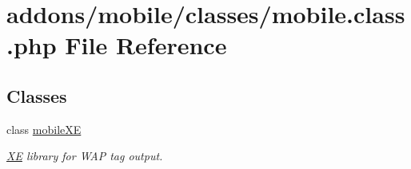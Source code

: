 \hypertarget{addons_2mobile_2classes_2mobile_8class_8php}{}\section{addons/mobile/classes/mobile.class.\+php File Reference}
\label{addons_2mobile_2classes_2mobile_8class_8php}
\subsection*{Classes}
\begin{DoxyCompactItemize}
\item 
class \hyperlink{classmobileXE}{mobile\+XE}
\begin{DoxyCompactList}\small\item\em \hyperlink{namespaceXE}{XE} library for W\+AP tag output. \end{DoxyCompactList}\end{DoxyCompactItemize}
